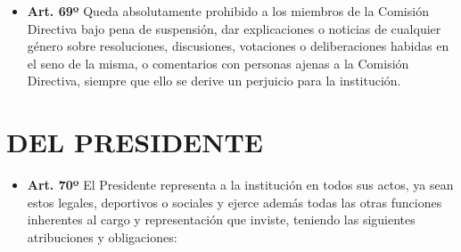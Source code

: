 \documentclass[]{book}
\providecommand{\tightlist}{%
  \setlength{\itemsep}{0pt}\setlength{\parskip}{0pt}}
\begin{document}
\begin{itemize}
\tightlist
\item
  \textbf{Art. 69º}
  Queda absolutamente prohibido a los miembros de la Comisión Directiva bajo pena de suspensión, dar explicaciones o noticias de cualquier género sobre resoluciones, discusiones, votaciones o deliberaciones habidas en el seno de la misma, o comentarios con personas ajenas a la Comisión Directiva, siempre que ello se derive un perjuicio para la institución.
\end{itemize}

\hypertarget{cap8}{%
\chapter{DEL PRESIDENTE}\label{cap8}}

\begin{itemize}
\tightlist
\item
  \textbf{Art. 70º}
  El Presidente representa a la institución en todos sus actos, ya sean estos legales, deportivos o sociales y ejerce además todas las otras funciones inherentes al cargo y representación que inviste, teniendo las siguientes atribuciones y obligaciones:


\end{itemize}
\end{document}
